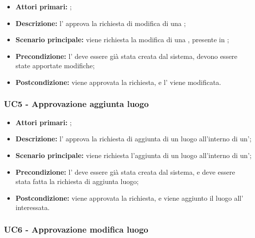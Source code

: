 \documentclass[casi-duso]{subfiles}
\begin{document}
\begin{itemize}
  \item \textbf{Attori primari:} ;
  \item \textbf{Descrizione:} l' approva la richiesta di modifica di una ;
  \item \textbf{Scenario principale:} viene richiesta la modifica di una , presente in ;
  \item \textbf{Precondizione:} l' deve essere già stata creata dal sistema, devono essere state apportate modifiche;
  \item \textbf{Postcondizione:} viene approvata la richiesta, e l' viene modificata.

\end{itemize}
\subsubsection{UC5 - Approvazione aggiunta luogo}
\label{subsub:UC5}

\begin{itemize}
  \item \textbf{Attori primari:} ;
  \item \textbf{Descrizione:} l' approva la richiesta di aggiunta di un luogo all'interno di un';
  \item \textbf{Scenario principale:} viene richiesta l'aggiunta di un luogo all'interno di un';
  \item \textbf{Precondizione:} l' deve essere già stata creata dal sistema, e deve essere stata fatta la richiesta di aggiunta luogo;
  \item \textbf{Postcondizione:} viene approvata la richiesta, e viene aggiunto il luogo all' interessata.

\end{itemize}
\subsubsection{UC6 - Approvazione modifica luogo}
\label{subsub:UC6}
\end{document}
